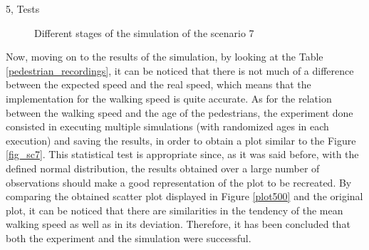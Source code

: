 \documentclass[10pt,a4paper]{article}
\begin{document}
\begin{task}{5, Tests}
\begin{figure} [H]
 \centering
 \caption{Different stages of the simulation of the scenario 7}
 \label{f3}
\end{figure}

Now, moving on to the results of the simulation, by looking at the Table \ref{pedestrian_recordings}, it can be noticed that there is not much of a difference between the expected speed and the real speed, which means that the implementation for the walking speed is quite accurate. As for the relation between the walking speed and the age of the pedestrians, the experiment done consisted in executing multiple simulations (with randomized ages in each execution) and saving the results, in order to obtain a plot similar to the Figure \ref{fig_sc7}. This statistical test is appropriate since, as it was said before, with the defined normal distribution, the results obtained over a large number of observations should make a good representation of the plot to be recreated. By comparing the obtained scatter plot displayed in Figure \ref{plot500} and the original plot, it can be noticed that there are similarities in the tendency of the mean walking speed as well as in its deviation. Therefore, it has been concluded that both the experiment and the simulation were successful. 


\end{task}
\end{document}
